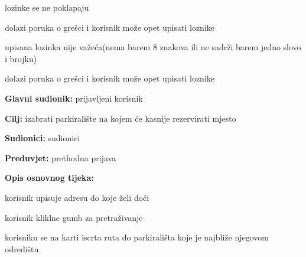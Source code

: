 \begin{packed_enum}
\begin{packed_item}
\begin{packed_item}
\begin{packed_enum}
							\end{packed_enum}
							\item[4.a] lozinke se ne poklapaju
							
							\begin{packed_enum}
								
								\item dolazi poruka o grešci i korisnik može opet upisati loznike
								
							\end{packed_enum}
							
							\item[4.b] upisana lozinka nije važeća(nema barem 8 znakova ili ne sadrži barem jedno slovo i brojku)
							
							\begin{packed_enum}
								
								\item dolazi poruka o grešci i korisnik može opet upisati loznike
								
							\end{packed_enum}
							
						\end{packed_item}
					\end{packed_item}
					
					\noindent {}
					\begin{packed_item}
						
						\item \textbf{Glavni sudionik: }prijavljeni korisnik
						\item  \textbf{Cilj:} izabrati parkiralište na kojem će kasnije rezervirati mjesto
						\item  \textbf{Sudionici:} sudionici
						\item  \textbf{Preduvjet:} prethodna prijava
						\item  \textbf{Opis osnovnog tijeka:}
						
						\item[] \begin{packed_enum}
							
							\item korisnik upisuje adresu do koje želi doći
							\item korisnik kliklne gumb za pretraživanje
							\item korisniku se na karti iscrta ruta do parkirališta koje je najbliže njegovom odredištu
						
						\end{packed_enum}
						

\end{packed_item}
\end{packed_enum}
